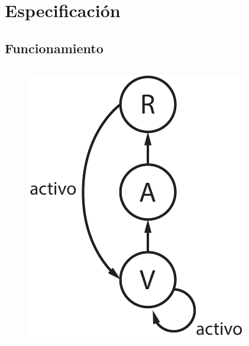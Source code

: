 \section{Especificación}

\subsection{Funcionamiento}

\begin{frame}
	\begin{columns}[T]
		\begin{column}{.35\textwidth}

			\begin{figure}[ht]
				\centering 
				\includegraphics[scale=0.6]{diagramas/fsm-light.pdf}
			\end{figure}

		\end{column}
		\hfill
		\begin{column}{.65\textwidth}
			

\end{column}
\end{columns}
\end{frame}
